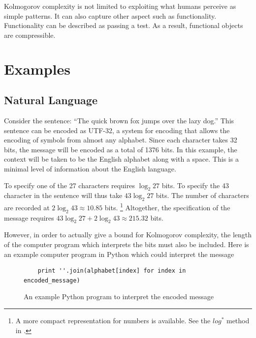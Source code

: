 Kolmogorov complexity is not limited to exploiting what humans perceive as simple patterns.
It can also capture other aspect such as functionality.
Functionality can be described as passing a test.
As a result, functional objects are compressible.

\section{Examples}
\subsection{Natural Language}
Consider the sentence: ``The quick brown fox jumps over the lazy dog.''
This sentence can be encoded as UTF-32, a system for encoding that allows the encoding of symbols from almost any alphabet.
Since each character takes 32 bits, the message will be encoded as a total of 1376 bits.
In this example, the context will be taken to be the English alphabet along with a space.
This is a minimal level of information about the English language.

To specify one of the 27 characters requires $\log_2 27$ bits. 
To specify the 43 character in the sentence will thus take $43 \log_2 27$ bits.
The number of characters are recorded at $2 \log_2 43 \approx 10.85$ bits. 
\footnote{A more compact representation for numbers is available. See the $log^*$ method in \citet{Cover2006}.}
Altogether, the specification of the message requires $43 \log_2 27 + 2 \log_2 43 \approx 215.32$ bits. 


However, in order to actually give a bound for Kolmogorov complexity, the length of the computer program which interprets the bits must also be included.
Here is an example computer program in Python which could interpret the message
\begin{figure}[H]
\begin{mdframed}
\begin{verbatim}
    print ''.join(alphabet[index] for index in encoded_message)
\end{verbatim}
\end{mdframed}
\caption{An example Python program to interpret the encoded message}
\end{figure}

